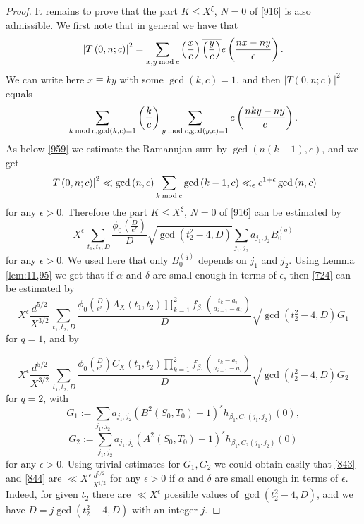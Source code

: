 \documentclass[12pt]{amsart}
\theoremstyle{definition}
\numberwithin{equation}{section}
\begin{document}
\begin{proof}
It remains to prove that the part $K\le X^{\xi}$, $N=0$ of
\eqref{916} is also admissible. We first note that in
general we have that
\[\left|T\left(0,n;c\right)\right|^2=\sum_{x,y\:{\rm m}{\rm o}{\rm d}\:
c}\left(\frac xc\right)\overline {\left(\frac yc\right)}e\left(\frac {
nx-ny}c\right).\]
We can write here $x\equiv ky$ with some $\gcd\left(k,c\right)=1$, and
then $\left|T\left(0,n;c\right)\right|^2$ equals
\[\sum_{k\:{\rm m}{\rm o}{\rm d}\:c,\gcd\left(k,c\right)=1}\left(\frac
kc\right)\sum_{y\:{\rm m}{\rm o}{\rm d}\:c,\gcd\left(y,c\right)=1}
e\left(\frac {nky-ny}c\right).\]
As below \eqref{959} we estimate the
Ramanujan sum by $\gcd\left(n\left(k-1\right),c\right)$, and we get
\[\left|T\left(0,n;c\right)\right|^2\ll\gcd\left(n,c\right)\sum_{
k\:{\rm m}{\rm o}{\rm d}\:c}\gcd\left(k-1,c\right)\ll_{\epsilon}c^{
1+\epsilon}\gcd\left(n,c\right)\]
for any $\epsilon >0$. Therefore the part $K\le X^{\xi}$, $N=0$ of
\eqref{916} can be estimated by
\begin{equation}X^{\epsilon}\sum_{\,t_1,t_2,D}\frac {\phi_0\left(\frac
D{e^r}\right)}D\sqrt {\gcd\left(t_2^2-4,D\right)}\sum_{j_1,j_2}a_{
j_1,j_2}B_0^{(q)}\label{724}\end{equation}
for any $\epsilon >0$. We used here that only $B_0^{(q)}$ depends on $
j_1$
and $j_2$. Using Lemma \ref{lem:11,95} we get that if $\alpha$ and $
\delta$ are
small enough in terms of $\epsilon$, then \eqref{724} can be estimated by
\begin{equation}X^{\epsilon}\frac {d^{5/2}}{X^{3/2}}\sum_{\,t_1,t_
2,D}\frac {\phi_0\left(\frac D{e^r}\right)A_X\left(t_1,t_2\right)
\prod_{k=1}^2f_{\beta_1}\left(\frac {t_k-a_i}{a_{i+1}-a_i}\right)}
D\sqrt {\gcd\left(t_2^2-4,D\right)}G_1\label{843}\end{equation}
for $q=1$, and by

\begin{equation}X^{\epsilon}\frac {d^{5/2}}{X^{3/2}}\sum_{\,t_1,t_
2,D}\frac {\phi_0\left(\frac D{e^r}\right)C_X\left(t_1,t_2\right)
\prod_{k=1}^2f_{\beta_1}\left(\frac {t_k-a_i}{a_{i+1}-a_i}\right)}
D\sqrt {\gcd\left(t_2^2-4,D\right)}G_2\label{844}\end{equation}
for $q=2$, with
\[G_1:=\sum_{j_1,j_2}a_{j_1,j_2}\left(B^2\left(S_0,T_0\right)-1\right
)^sh_{\beta_1,C_1\left(j_1,j_2\right)}\left(0\right),\]
\[G_2:=\sum_{j_1,j_2}a_{j_1,j_2}\left(A^2\left(S_0,T_0\right)-1\right
)^sh_{\beta_1,C_2\left(j_1,j_2\right)}\left(0\right)\]
for any $\epsilon >0$. Using trivial estimates for $G_1,G_2$ we could obtain easily
that \eqref{843} and \eqref{844} are $\ll X^{\epsilon}\frac {d^{5
/2}}{X^{1/2}}$ for any
$\epsilon >0$ if $\alpha$ and $\delta$ are small enough in terms of $
\epsilon$. Indeed,
for given $t_2$ there are $\ll X^{\epsilon}$ possible values of
$\gcd\left(t_2^2-4,D\right)$, and we have $D=j\gcd\left(t_2^2-4,D\right
)$ with an
integer $j$.


\end{proof}
\end{document}
